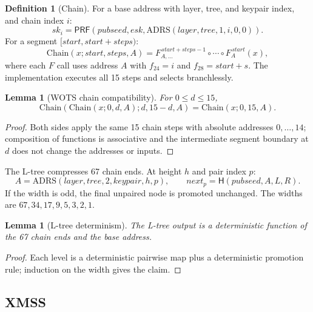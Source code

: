 \documentclass[11pt,a4paper]{article}
\theoremstyle{plain}
\newtheorem{lemma}[theorem]{Lemma}
\theoremstyle{definition}
\newtheorem{definition}[theorem]{Definition}
\theoremstyle{remark}
\newcommand{\Hash}{\mathsf{H}}
\newcommand{\PRF}{\mathsf{PRF}}
\begin{document}
\begin{definition}[Chain]
For a base address with layer, tree, and keypair index, and chain
index $i$:
\[
 \mathit{sk}_i=\PRF(\mathit{pubseed},\mathit{esk},
 \mathrm{ADRS}(\mathit{layer},\mathit{tree},1,i,0,0)).
\]
For a segment $[start,start+steps)$:
\[
 \mathrm{Chain}(x;start,steps,A)=
 F^{\,start+steps-1}_{A,\ldots}\circ\cdots\circ
 F^{\,start}_{A}(x),
\]
where each $F$ call uses address $A$ with $f_{24}=i$ and
$f_{28}=start+s$.  The implementation executes all 15 steps and
selects branchlessly.
\end{definition}

\begin{lemma}[WOTS chain compatibility]
\label{lem:wots-chain}
For $0\le d\le15$,
\[
 \mathrm{Chain}(\mathrm{Chain}(x;0,d,A);d,15-d,A)
 =\mathrm{Chain}(x;0,15,A).
\]
\end{lemma}

\begin{proof}
Both sides apply the same 15 chain steps with absolute addresses
$0,\ldots,14$; composition of functions is associative and the
intermediate segment boundary at $d$ does not change the addresses or
inputs.
\end{proof}

The L-tree compresses 67 chain ends.  At height $h$ and pair index $p$:
\[
 A=\mathrm{ADRS}(\mathit{layer},\mathit{tree},2,
 \mathit{keypair},h,p),\qquad
 \mathit{next}_p=\Hash(\mathit{pubseed},A,L,R).
\]
If the width is odd, the final unpaired node is promoted unchanged.
The widths are $67,34,17,9,5,3,2,1$.

\begin{lemma}[L-tree determinism]
\label{lem:ltree}
The L-tree output is a deterministic function of the 67 chain ends and
the base address.
\end{lemma}

\begin{proof}
Each level is a deterministic pairwise map plus a deterministic
promotion rule; induction on the width gives the claim.
\end{proof}

\subsection{XMSS}
\end{document}
